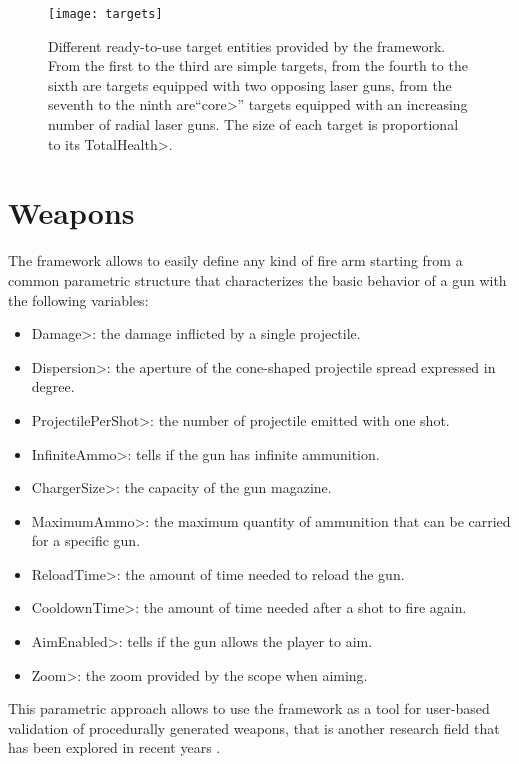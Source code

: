 \begin{figure}
\centering
\texttt{[image: targets]}
\caption[Different ready-to-use target entities provided by the framework.]{Different ready-to-use target entities provided by the framework. From the first to the third are simple targets, from the fourth to the sixth are targets equipped with two opposing laser guns, from the seventh to the ninth are``\<core>'' targets equipped with an increasing number of radial laser guns. The size of each target is proportional to its \<TotalHealth>.}
\label{fig:targets}
\end{figure}


\section{Weapons}

The framework allows to easily define any kind of fire arm starting from a common parametric structure that characterizes the basic behavior of a gun with the following variables: 

\begin{itemize}
\item \<Damage>: the damage inflicted by a single projectile.
\item \<Dispersion>: the aperture of the cone-shaped projectile spread expressed in degree.
\item \<ProjectilePerShot>: the number of projectile emitted with one shot.
\item \<InfiniteAmmo>: tells if the gun has infinite ammunition.
\item \<ChargerSize>: the capacity of the gun magazine.
\item \<MaximumAmmo>: the maximum quantity of ammunition that can be carried for a specific gun.
\item \<ReloadTime>: the amount of time needed to reload the gun.
\item \<CooldownTime>:  the amount of time needed after a shot to fire again.
\item \<AimEnabled>: tells if the gun allows the player to aim.
\item \<Zoom>: the zoom provided by the scope when aiming.
\end{itemize}

\noindent This parametric approach allows to use the framework as a tool for user-based validation of procedurally generated weapons, that is another research field that has been explored in recent years \cite{ArmiProcedurali}.

